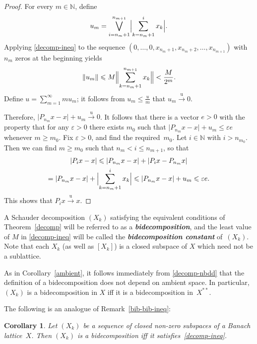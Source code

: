 \documentclass[12pt]{amsart}
\theoremstyle{plain}
\newtheorem{corollary}[theorem]{Corollary}
\theoremstyle{definition}
\newcommand{\abs}[1]{\lvert#1\rvert}
\newcommand{\norm}[1]{\lVert#1\rVert}
\newcommand{\Bigabs}[1]{\Bigl\lvert#1\Bigr\rvert}
\newcommand{\Bignorm}[1]{\Bigl\lVert#1\Bigr\rVert}
\newcommand{\term}[1]{{\textit{\textbf{#1}}}}   %
\newcommand{\goesu}{\xrightarrow{\mathrm{u}}} %
\renewcommand{\le}{\leqslant}
\renewcommand{\ge}{\geqslant}
\begin{document}
\begin{proof}
  For every $m\in\mathbb N$, define
  \begin{displaymath}
    u_m=\bigvee_{i=n_m+1}^{n_{m+1}}\Bigabs{\sum_{k=n_m+1}^ix_k}.
  \end{displaymath}
  Applying \eqref{decomp-ineq} to the sequence
  \begin{math}
    (0,\dots,0,x_{n_m+1},x_{n_m+2},\dots, x_{n_{m+1}})
  \end{math}
  with $n_m$ zeros at the beginning yields
  \begin{displaymath}
    \norm{u_m}\le M\Bignorm{\sum_{k=n_m+1}^{n_{m+1}}x_k}<\frac{M}{2^m}.
  \end{displaymath}
  Define $u=\sum_{m=1}^\infty mu_m$; it follows from
  $u_m\le\frac{u}{m}$ that $u_m\goesu 0$. 

  Therefore, $\abs{P_{n_m}x-x}+u_m\goesu 0$. It follows that there is
  a vector $e>0$ with the property that for any $\varepsilon>0$ there
  exists $m_0$ such that $\abs{P_{n_m}x-x}+u_m\le\varepsilon e$
  whenever $m\ge m_0$. Fix $\varepsilon>0$, and find the required~$m_0$. Let
  $i\in\mathbb N$ with $i>n_{m_0}$. Then we can find $m\ge m_0$ such
  that $n_m<i\le n_{m+1}$, so that
  \begin{multline*}
    \abs{P_ix-x}\le\abs{P_{n_m}x-x}+\abs{P_ix-P_{n_m}x}\\
    =\abs{P_{n_m}x-x}+\Bigabs{\sum_{k=n_m+1}^ix_k}
    \le\abs{P_{n_m}x-x}+u_m\le\varepsilon e.
  \end{multline*}
  This shows that $P_ix\goesu x$.
\end{proof}

A Schauder decomposition $(X_k)$ satisfying the equivalent conditions
of Theorem~\ref{decomp} will be referred to as a
\term{bidecomposition}, and the least value of $M$ in
\eqref{decomp-ineq} will be called the \term{bidecomposition constant}
of~$(X_k)$. Note that each $X_k$ (as well as $[X_k]$) is a closed
subspace of $X$ which need not be a sublattice.

As in Corollary~\ref{ambient}, it follows immediately from
\eqref{decomp-nbdd} that the definition of a bidecomposition does not
depend on ambient space. In particular, $(X_k)$ is a bidecomposition
in $X$ iff it is a bidecomposition in~$X^{**}$.

The following is an analogue of Remark~\ref{bib-bib-ineq}:

\begin{corollary}
  Let $(X_k)$ be a sequence of closed non-zero subspaces of a Banach
  lattice~$X$. Then $(X_k)$ is a bidecomposition iff it
  satisfies~\eqref{decomp-ineq}.
\end{corollary}
\end{document}
